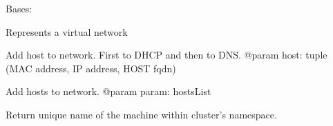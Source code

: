 \documentclass[letterpaper,10pt,english]{sphinxmanual}
\begin{document}
\begin{fulllineitems}
\label{ref-manual/XrdTest:XrdTest.ClusterUtils.Network}
Bases: 

Represents a virtual network

\begin{fulllineitems}
\label{ref-manual/XrdTest:XrdTest.ClusterUtils.Network.addDHCPHost}
\end{fulllineitems}


\begin{fulllineitems}
\label{ref-manual/XrdTest:XrdTest.ClusterUtils.Network.addDnsHost}
\end{fulllineitems}


\begin{fulllineitems}
\label{ref-manual/XrdTest:XrdTest.ClusterUtils.Network.addHost}
Add host to network. First to DHCP and then to DNS.
@param host: tuple (MAC address, IP address, HOST fqdn)

\end{fulllineitems}


\begin{fulllineitems}
\label{ref-manual/XrdTest:XrdTest.ClusterUtils.Network.addHosts}
Add hosts to network.
@param param: hostsList

\end{fulllineitems}


\begin{fulllineitems}
\label{ref-manual/XrdTest:XrdTest.ClusterUtils.Network.uname}
Return unique name of the machine within cluster's namespace.

\end{fulllineitems}



\end{fulllineitems}
\end{document}
